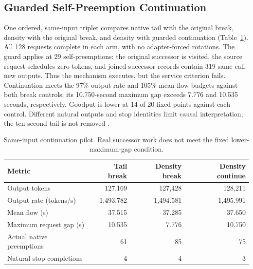 \documentclass[10pt]{article}
\begin{document}
\subsection{Guarded Self-Preemption Continuation}\label{sec:selfcontinue}
One ordered, same-input triplet compares native tail with the original break, density with the original break, and density with guarded continuation (Table~\ref{tab:selfcontinue}). All 128 requests complete in each arm, with no adapter-forced rotations. The guard applies at 29 self-preemptions: the original successor is visited, the source request schedules zero tokens, and joined successor records contain 319 same-call new outputs. Thus the mechanism executes, but the service criterion fails. Continuation meets the 97\% output-rate and 105\% mean-flow budgets against both break controls; its 10.750-second maximum gap exceeds 7.776 and 10.535 seconds, respectively. Goodput is lower at 14 of 20 fixed points against each control. Different natural outputs and stop identities limit causal interpretation; the ten-second tail is not removed \cite{residencycontinue}.

\begin{table}[t]
\centering\small
\caption{Same-input continuation pilot. Real successor work does not meet the fixed lower-maximum-gap condition.}
\label{tab:selfcontinue}
\begin{tabular}{lrrr}
\toprule
Metric & Tail break & Density break & Density continue \\
\midrule
Output tokens & 127,169 & 127,428 & 128,211 \\
Output rate (tokens/s) & 1,493.782 & 1,494.581 & 1,495.991 \\
Mean flow (s) & 37.515 & 37.285 & 37.650 \\
Maximum request gap (s) & 10.535 & 7.776 & 10.750 \\
Actual native preemptions & 61 & 85 & 75 \\
Natural stop completions & 4 & 4 & 3 \\
\bottomrule
\end{tabular}
\end{table}
\end{document}
